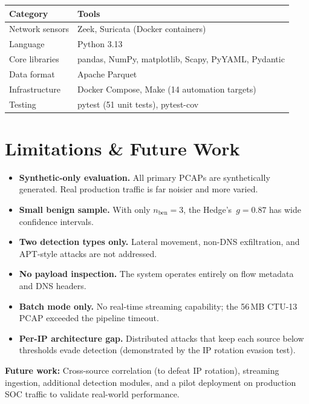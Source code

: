 \documentclass[11pt, a4paper]{article}
\begin{document}
\begin{table}[H]
\centering\small
\begin{tabular}{@{} l l @{}}
\toprule
\textbf{Category} & \textbf{Tools} \\
\midrule
Network sensors   & Zeek, Suricata (Docker containers) \\
Language          & Python 3.13 \\
Core libraries    & pandas, NumPy, matplotlib, Scapy, PyYAML, Pydantic \\
Data format       & Apache Parquet \\
Infrastructure    & Docker Compose, Make (14 automation targets) \\
Testing           & pytest (51 unit tests), pytest-cov \\
\bottomrule
\end{tabular}
\end{table}

\section{Limitations \& Future Work}

\begin{itemize}[itemsep=3pt]
    \item \textbf{Synthetic-only evaluation.}\; All primary PCAPs are synthetically generated. Real production traffic is far noisier and more varied.
    \item \textbf{Small benign sample.}\; With only $n_{\text{ben}}=3$, the Hedge's~$g = 0.87$ has wide confidence intervals.
    \item \textbf{Two detection types only.}\; Lateral movement, non-DNS exfiltration, and APT-style attacks are not addressed.
    \item \textbf{No payload inspection.}\; The system operates entirely on flow metadata and DNS headers.
    \item \textbf{Batch mode only.}\; No real-time streaming capability; the 56\,MB CTU-13 PCAP exceeded the pipeline timeout.
    \item \textbf{Per-IP architecture gap.}\; Distributed attacks that keep each source below thresholds evade detection (demonstrated by the IP rotation evasion test).
\end{itemize}

\noindent\textbf{Future work:} Cross-source correlation (to defeat IP rotation), streaming ingestion, additional detection modules, and a pilot deployment on production SOC traffic to validate real-world performance.
\end{document}
